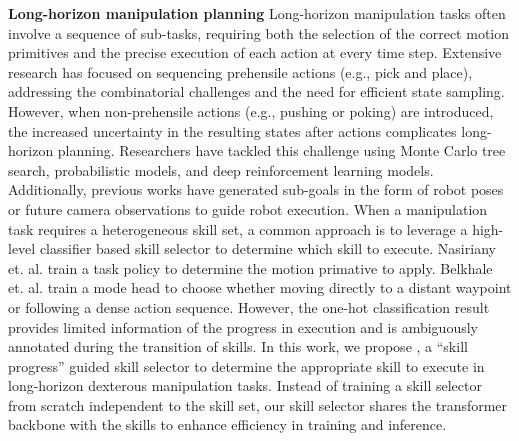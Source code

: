 {\bf Long-horizon manipulation planning} 
Long-horizon manipulation tasks often involve a sequence of sub-tasks, requiring both the selection of the correct motion primitives and the precise execution of each action at every time step. 
Extensive research has focused on sequencing prehensile actions (e.g., pick and place), addressing the combinatorial challenges\cite{garrett2020pddlstream,gao2023minimizing,wang2021uniform} and the need for efficient state sampling\cite{garrett2020pddlstream,chang2023lgmcts,gao2022fast}. However, when non-prehensile actions (e.g., pushing or poking) are introduced, the increased uncertainty in the resulting states after actions complicates long-horizon planning. 
Researchers have tackled this challenge using Monte Carlo tree search\cite{chang2023lgmcts,vieira2023effective}, probabilistic models\cite{mishra2023generative}, and deep reinforcement learning models\cite{nasiriany2022augmenting,agia2023stap}. 
Additionally, previous works have generated sub-goals in the form of robot poses\cite{liu2024moka, belkhale2023hydra} or future camera observations\cite{du2024learning,mandlekar2020learning} to guide robot execution. 
When a manipulation task requires a heterogeneous skill set, a common approach is to leverage a high-level classifier based skill selector to determine which skill to execute. 
Nasiriany et. al.\cite{nasiriany2022augmenting} train a task policy to determine the motion primative to apply. 
Belkhale et. al. \cite{belkhale2023hydra} train a mode head to choose whether moving directly to a distant waypoint or following a dense action sequence.
However, the one-hot classification result provides limited information of the progress in execution and is ambiguously annotated during the transition of skills.
In this work, we propose \progss, a ``skill progress'' guided skill selector to determine the appropriate skill to execute in long-horizon dexterous manipulation tasks. 
Instead of training a skill selector from scratch independent to the skill set, our skill selector shares the transformer backbone with the skills to enhance efficiency in training and inference.
